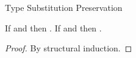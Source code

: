 \begin{lemma}{Type Substitution Preservation}

\label{lemtyp}

If \judeh{\envextt{\env}{\first{\tyvarh}}}{\first{\varexph}}{\first{\vartyh}} and \judth{\env}{\second{\vartyh}} then \judeh{\env}{\expsubst{\first{\varexph}}{\second{\vartyh}}{\first{\tyvarh}}}{\tysubst{\first{\vartyh}}{\second{\vartyh}}{\first{\tyvarh}}}.  If \judem{\envextt{\env}{\first{\tyvarm}}}{\first{\varexpm}}{\first{\vartym}} and \judtm{\env}{\second{\vartym}} then \judem{\env}{\expsubst{\first{\varexpm}}{\second{\vartym}}{\first{\tyvarm}}}{\tysubst{\first{\vartym}}{\second{\vartym}}{\first{\tyvarm}}}.

\begin{proof}

By structural induction.

\end{proof}

\end{lemma}
